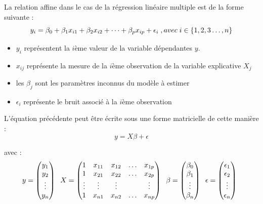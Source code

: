\documentclass[
]{book}
\providecommand{\tightlist}{%
  \setlength{\itemsep}{0pt}\setlength{\parskip}{0pt}}
\begin{document}
La relation affine dans le cas de la régression linéaire multiple est de la forme suivante :
\[y_i = \beta_0 + \beta_1x_{i1} + \beta_2x_{i2} +\dots+\beta_px_{ip}+\epsilon_{i}\;, \\ avec\;i\in\{1,2,3\dots,n\}\]

\begin{itemize}
\tightlist
\item
  \(y_i\) représentent la \(i\)ème valeur de la variable dépendantes \(y\).
\item
  \(x_{ij}\) représente la mesure de la \(i\)ème observation de la variable explicative \(X_j\)
\item
  les \(\beta_j\) sont les paramètres inconnus du modèle à estimer
\item
  \(\epsilon_i\) représente le bruit associé à la \(i\)ème observation\\
\end{itemize}

L'équation précédente peut être écrite sous une forme matricielle de cette manière :\\

\begin{equation}
y = X\beta +\epsilon
\label{eq:lm-multiple}
\end{equation}

avec :
\[ y = \begin{pmatrix}y_1\\y_2\\\vdots\\y_n \end{pmatrix} \hspace{.2cm} 
   X = \begin{pmatrix}
   1 & x_{11} & x_{12} & \dots &x_{1p}\\
   1 & x_{21} & x_{22} & \dots &x_{2p}\\
   \vdots &\vdots&\vdots & &\vdots\\
   1 & x_{n1} & x_{n2} & \dots &x_{np}
   \end{pmatrix} \hspace{.2cm}
   \beta = \begin{pmatrix}\beta_0\\\beta_1\\\vdots\\\beta_n \end{pmatrix} \hspace{.2cm}
   \epsilon = \begin{pmatrix}\epsilon_1\\\epsilon_2\\\vdots\\\epsilon_n \end{pmatrix} \hspace{.2cm}
\]
\end{document}
